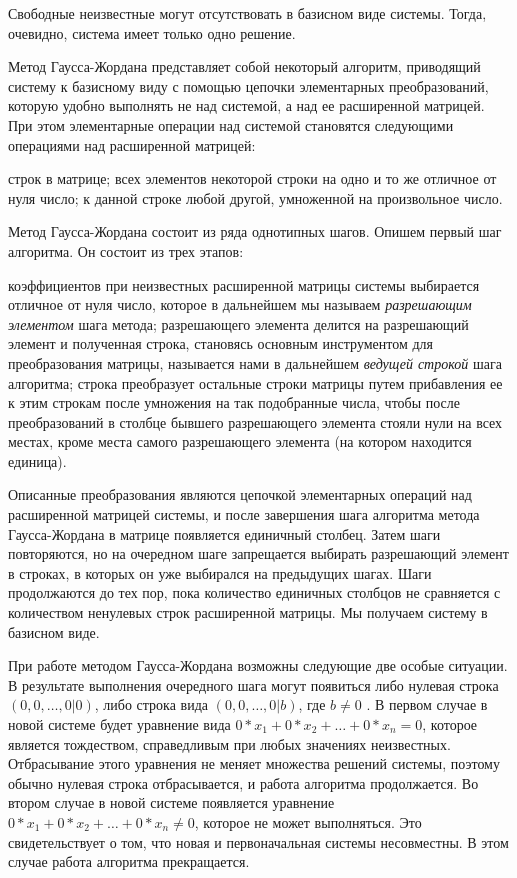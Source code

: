 Свободные неизвестные могут отсутствовать в базисном виде системы. Тогда, очевидно, система имеет только одно решение.

Метод Гаусса-Жордана представляет собой некоторый алгоритм, приводящий систему к базисному виду с помощью цепочки элементарных преобразований, которую удобно выполнять не над системой, а над ее расширенной матрицей. При этом элементарные операции над системой становятся следующими операциями над расширенной матрицей:
		\begin{enumerate}
			\renewcommand{\theenumi}{(\arabic{enumi})}
			\renewcommand{\labelenumi}{\arabic{enumi})}
			 строк в матрице;
			 всех элементов некоторой строки на одно и то же отличное от нуля число;
			 к данной строке любой другой, умноженной на произвольное число.
		\end{enumerate}

Метод Гаусса-Жордана состоит из ряда однотипных шагов. Опишем первый шаг алгоритма. Он состоит из трех этапов:
		\begin{enumerate}
			\renewcommand{\theenumi}{(\arabic{enumi})}
			\renewcommand{\labelenumi}{\arabic{enumi})}
			 коэффициентов при неизвестных расширенной матрицы системы выбирается отличное от нуля число, которое в дальнейшем мы называем  \textit{разрешающим элементом} шага метода;
			 разрешающего элемента делится на разрешающий элемент и полученная строка, становясь основным инструментом для преобразования матрицы, называется нами в дальнейшем \textit{ведущей строкой} шага алгоритма;
			 строка преобразует остальные строки матрицы путем прибавления ее к этим строкам после умножения на так подобранные числа, чтобы после преобразований в столбце бывшего разрешающего элемента стояли нули на всех местах, кроме места самого разрешающего элемента (на котором находится единица).
		\end{enumerate}

Описанные преобразования являются цепочкой элементарных операций над расширенной матрицей системы, и после завершения шага алгоритма метода Гаусса-Жордана в матрице появляется единичный столбец. Затем шаги повторяются, но на очередном шаге запрещается выбирать разрешающий элемент в строках, в которых он уже выбирался на предыдущих шагах. Шаги продолжаются до тех пор, пока количество единичных столбцов не сравняется с количеством ненулевых строк расширенной матрицы. Мы получаем систему в базисном виде.

При работе методом Гаусса-Жордана возможны следующие две особые ситуации. В результате выполнения очередного шага могут появиться либо нулевая строка
$(0, 0,\dots, 0|0)$, либо строка вида $(0, 0,\dots, 0|b)$, где $b \neq 0$ . В первом случае в новой системе будет уравнение вида $0*x_1 + 0*x_2 + \dots + 0*x_n=0$, которое является тождеством, справедливым при любых значениях неизвестных. Отбрасывание этого уравнения не меняет множества решений системы, поэтому обычно нулевая строка отбрасывается, и работа алгоритма продолжается. Во втором случае в новой системе появляется уравнение $0*x_1 + 0*x_2 + \dots + 0*x_n \neq 0$, которое не может выполняться. Это свидетельствует о том, что новая и первоначальная системы несовместны. В этом случае работа алгоритма прекращается.

